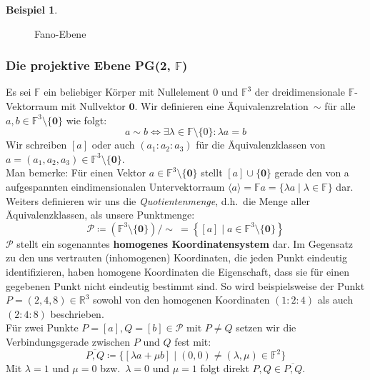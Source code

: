 \documentclass[hidelinks]{article}
\theoremstyle{plain}
\theoremstyle{definition}
\newtheorem{bsp}[thm]{Beispiel}
\theoremstyle{rem}
\newcommand{\pgtwo}{PG(2, $\mathbb{F}$)\ }
\newcommand{\fnz}{\mathbb{F}\setminus\{0\}}
\newcommand{\ftnz}{\mathbb{F}^{3}\setminus\{\boldsymbol 0\}}
\begin{document}
\begin{sloppypar}
\begin{bsp}
\begin{figure}[H]
\caption{Fano-Ebene}
\end{figure}
\end{bsp}


\subsubsection{Die projektive Ebene \pgtwo}
Es sei $\mathbb{F}$ ein beliebiger Körper mit Nullelement $0$ und $\mathbb{F}^3$ der dreidimensionale $\mathbb{F}$-Vektorraum mit Nullvektor $\boldsymbol 0$. Wir definieren eine Äquivalenzrelation~$\sim$ für alle $a,b\in\ftnz$ wie folgt:\\
\begin{equation*}
	a\sim b \Leftrightarrow \exists\lambda\in\fnz:\lambda a=b
\end{equation*}
Wir schreiben $[a]$ oder auch $(a_1:a_2:a_3)$ für die Äquivalenzklassen von $a=(a_1,a_2,a_3)\in\ftnz$.\\
Man bemerke: Für einen Vektor $a\in\ftnz$ stellt $[a]\cup\{\boldsymbol 0\}$ gerade den von a aufgespannten eindimensionalen Untervektorraum $\langle a \rangle=\mathbb{F}a=\{\lambda a\mid\lambda\in\mathbb{F}\}$ dar.\\

Weiters definieren wir uns die \textit{Quotientenmenge}, d.h.\ die Menge aller Äquivalenzklassen, als unsere Punktmenge:
\begin{equation*}
	\mathcal{P}\coloneqq(\ftnz)/\sim\ = \left \{[a]\mid a\in\ftnz\right \}
\end{equation*}
$\mathcal{P}$ stellt ein sogenanntes \textbf{homogenes Koordinatensystem} dar. Im Gegensatz zu den uns vertrauten (inhomogenen) Koordinaten, die jeden Punkt eindeutig identifizieren, haben homogene Koordinaten die Eigenschaft, dass sie für einen gegebenen Punkt nicht eindeutig bestimmt sind. So wird beispielsweise der Punkt $P=(2,4,8)\in\mathbb{R}^3$ sowohl von den homogenen Koordinaten $(1:2:4)$ als auch $(2:4:8)$ beschrieben.\\

Für zwei Punkte $P=[a],Q=[b]\in\mathcal{P}$ mit $P\ne Q$ setzen wir die Verbindungsgerade zwischen $P$ und $Q$ fest mit:
\begin{equation*}
	\overline{P,Q}\coloneqq\bigl \{[\lambda a+\mu b]\mid (0,0)\ne(\lambda,\mu)\in\mathbb{F}^2\bigr \}
\end{equation*}
Mit $\lambda=1$ und $\mu=0$ bzw.\ $\lambda=0$ und $\mu=1$ folgt direkt $P,Q\in\overline{P,Q}$.\\


\end{sloppypar}
\end{document}
